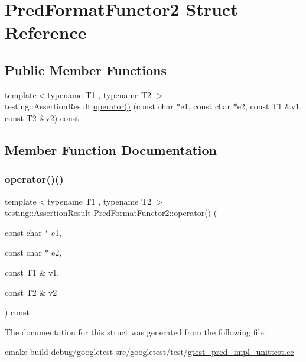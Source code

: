 \hypertarget{structPredFormatFunctor2}{}\section{Pred\+Format\+Functor2 Struct Reference}
\label{structPredFormatFunctor2}
\subsection*{Public Member Functions}
\begin{DoxyCompactItemize}
\item 
{\footnotesize template$<$typename T1 , typename T2 $>$ }\\testing\+::\+Assertion\+Result \mbox{\hyperlink{structPredFormatFunctor2_a0169e0105e15d5c63bece2a20646b22b}{operator()}} (const char $\ast$e1, const char $\ast$e2, const T1 \&v1, const T2 \&v2) const
\end{DoxyCompactItemize}


\subsection{Member Function Documentation}
\mbox{\label{structPredFormatFunctor2_a0169e0105e15d5c63bece2a20646b22b}} 
\subsubsection{\texorpdfstring{operator()()}{operator()()}}
{\footnotesize\ttfamily template$<$typename T1 , typename T2 $>$ \\
testing\+::\+Assertion\+Result Pred\+Format\+Functor2\+::operator() (\begin{DoxyParamCaption}\item[{const char $\ast$}]{e1,  }\item[{const char $\ast$}]{e2,  }\item[{const T1 \&}]{v1,  }\item[{const T2 \&}]{v2 }\end{DoxyParamCaption}) const\hspace{0.3cm}{\ttfamily [inline]}}



The documentation for this struct was generated from the following file\+:\begin{DoxyCompactItemize}
\item 
cmake-\/build-\/debug/googletest-\/src/googletest/test/\mbox{\hyperlink{gtest__pred__impl__unittest_8cc}{gtest\+\_\+pred\+\_\+impl\+\_\+unittest.\+cc}}\end{DoxyCompactItemize}
